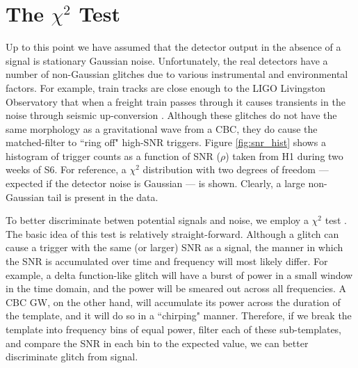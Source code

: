 \section{The $\chi^2$ Test}
\label{sec:chisq}

Up to this point we have assumed that the detector output in the absence of a signal is stationary Gaussian noise. Unfortunately, the real detectors have a number of non-Gaussian glitches due to various instrumental and environmental factors. For example, train tracks are close enough to the \ac{LIGO} Livingston Observatory that when a freight train passes through it causes transients in the noise through seismic up-conversion \cite{ref:?}. Although these glitches do not have the same morphology as a gravitational wave from a \ac{CBC}, they do cause the matched-filter to ``ring off" high-\ac{SNR} triggers. Figure \ref{fig:snr_hist} shows a histogram of trigger counts as a function of \ac{SNR} ($\rho$) taken from H1 during two weeks of \ac{S6}. For reference, a $\chi^2$ distribution with two degrees of freedom --- expected if the detector noise is Gaussian --- is shown. Clearly, a large non-Gaussian tail is present in the data.

To better discriminate betwen potential signals and noise, we employ a $\chi^2$ test \cite{ref:Allen:2006}. The basic idea of this test is relatively straight-forward. Although a glitch can cause a trigger with the same (or larger) \ac{SNR} as a signal, the manner in which the \ac{SNR} is accumulated over time and frequency will most likely differ. For example, a delta function-like glitch will have a burst of power in a small window in the time domain, and the power will be smeared out across all frequencies. A \ac{CBC} \ac{GW}, on the other hand, will accumulate its power across the duration of the template, and it will do so in a ``chirping" manner. Therefore, if we break the template into frequency bins of equal power, filter each of these sub-templates, and compare the \ac{SNR} in each bin to the expected value, we can better discriminate glitch from signal.

